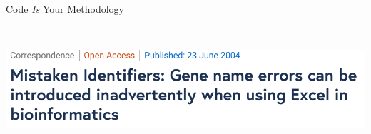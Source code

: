 \documentclass{beamer}
\begin{document}
\begin{frame}{Code \emph{Is} Your Methodology}
\begin{columns}
\begin{column}{.5\linewidth}
~\\

\includegraphics[width=\linewidth]{images/retraction_3}
\end{column}
\end{columns}


%
%

\end{frame}


%
%
%
%
%
\end{document}
